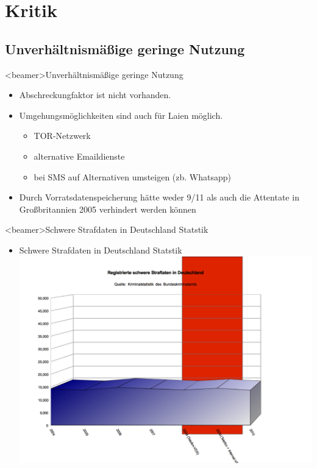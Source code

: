 \section{Kritik}
  \subsection{Unverhältnismäßige geringe Nutzung}
    \begin{frame}<beamer>{Unverhältnismäßige geringe Nutzung}
      \begin{itemize}
        \item
          Abschreckungfaktor ist nicht vorhanden.
         \item
         Umgehungsmöglichkeiten sind auch für Laien möglich.
           \begin{itemize}
         \item TOR-Netzwerk
         \item alternative Emaildienste
         \item bei SMS auf Alternativen umsteigen (zb. Whatsapp)
      \end{itemize}
        \item
       	Durch Vorratsdatenspeicherung hätte weder 9/11 als auch die Attentate in Großbritannien 2005 verhindert werden können
      \end{itemize}
    \end{frame}

\begin{frame}<beamer>{Schwere Strafdaten in Deutschland Statstik}
\begin{itemize}
        \item Schwere Strafdaten in Deutschland Statstik
        \includegraphics[height=1\textheight]{sections/img/schwere_verbrechen_in_DE.png}
    \end{itemize}
    \end{frame}
    
